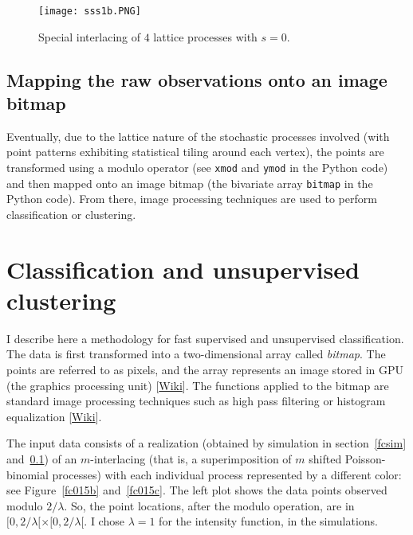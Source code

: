 \documentclass[oneside,10pt]{book}
\begin{document}
\begin{figure}[H]
\centering
\texttt{[image: sss1b.PNG]}
\caption{Special interlacing of $4$ lattice processes with $s=0$.}
\label{fcsss1}
\end{figure}

\subsection{Mapping the raw observations onto an image bitmap} \label{fcmap}

 Eventually, due to the lattice nature of the stochastic processes involved (with point patterns exhibiting statistical tiling around each vertex), the points are transformed using a modulo operator (see \texttt{xmod} and \texttt{ymod} in the Python code) and then mapped onto an image bitmap (the bivariate array \texttt{bitmap} in the Python code).
From there, image processing techniques are used to perform classification or clustering.
 
\section{Classification and unsupervised clustering}

I describe here a methodology for fast supervised and unsupervised 
classification. The data is first transformed into a 
two-dimensional array called {\em bitmap}. The points are referred to as pixels, and the array represents an image stored in 
\textcolor{index}{GPU} 
(the graphics processing unit) [\href{https://en.wikipedia.org/wiki/General-purpose_computing_on_graphics_processing_units}{Wiki}]. The functions applied to the bitmap are standard image processing techniques such as high pass filtering or 
\textcolor{index}{histogram equalization} [\href{https://en.wikipedia.org/wiki/Histogram_equalization}{Wiki}]. 

The input data consists of a realization (obtained by simulation in section~\ref{fcsim} and~\ref{fcmap}) of an 
\textcolor{index}{$m$-interlacing} (that is, a superimposition of $m$ shifted Poisson-binomial processes) with each individual process represented by a different color: see Figure~\ref{fc015b} and~\ref{fc015c}. The left plot shows the data points observed modulo $2/\lambda$. So, the point locations, after the modulo operation, are in 
$[0, 2/\lambda[ \times [0, 2/\lambda[$. I chose $\lambda=1$ for the intensity function, in the simulations. 
\end{document}
